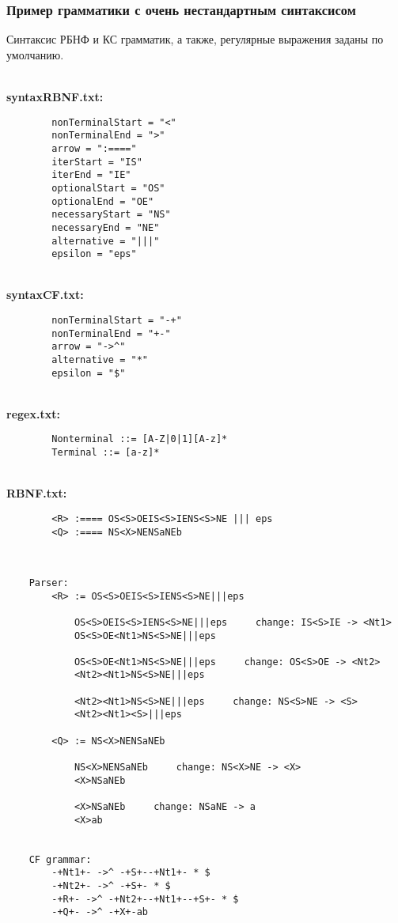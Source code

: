 \documentclass[12pt]{article}
\begin{document}
    \clearpage


    \subsubsection*{\large Пример грамматики с очень нестандартным синтаксисом}
    Синтаксис РБНФ и КС грамматик, а также, регулярные выражения заданы по умолчанию.

    \hfill \\
    {\bfseries syntaxRBNF.txt:}
    \begin{lstlisting}
        nonTerminalStart = "<"
        nonTerminalEnd = ">"
        arrow = ":===="
        iterStart = "IS"
        iterEnd = "IE"
        optionalStart = "OS"
        optionalEnd = "OE"
        necessaryStart = "NS"
        necessaryEnd = "NE"
        alternative = "|||"
        epsilon = "eps"
    \end{lstlisting}

    \hfill \\
    {\bfseries syntaxCF.txt:}
    \begin{lstlisting}
        nonTerminalStart = "-+"
        nonTerminalEnd = "+-"
        arrow = "->^"
        alternative = "*"
        epsilon = "$"
    \end{lstlisting}

    \hfill \\
    {\bfseries regex.txt:}
    \begin{lstlisting}
        Nonterminal ::= [A-Z|0|1][A-z]*
        Terminal ::= [a-z]*
    \end{lstlisting}

    \hfill \\
    {\bfseries RBNF.txt:}
    \begin{lstlisting}
        <R> :==== OS<S>OEIS<S>IENS<S>NE ||| eps
        <Q> :==== NS<X>NENSaNEb
    \end{lstlisting}

    \hfill \\
    \begin{lstlisting}
    Parser:
        <R> := OS<S>OEIS<S>IENS<S>NE|||eps

            OS<S>OEIS<S>IENS<S>NE|||eps     change: IS<S>IE -> <Nt1>
            OS<S>OE<Nt1>NS<S>NE|||eps

            OS<S>OE<Nt1>NS<S>NE|||eps     change: OS<S>OE -> <Nt2>
            <Nt2><Nt1>NS<S>NE|||eps

            <Nt2><Nt1>NS<S>NE|||eps     change: NS<S>NE -> <S>
            <Nt2><Nt1><S>|||eps

        <Q> := NS<X>NENSaNEb

            NS<X>NENSaNEb     change: NS<X>NE -> <X>
            <X>NSaNEb

            <X>NSaNEb     change: NSaNE -> a
            <X>ab


    CF grammar:
        -+Nt1+- ->^ -+S+--+Nt1+- * $
        -+Nt2+- ->^ -+S+- * $
        -+R+- ->^ -+Nt2+--+Nt1+--+S+- * $
        -+Q+- ->^ -+X+-ab

    \end{lstlisting}
\end{document}
